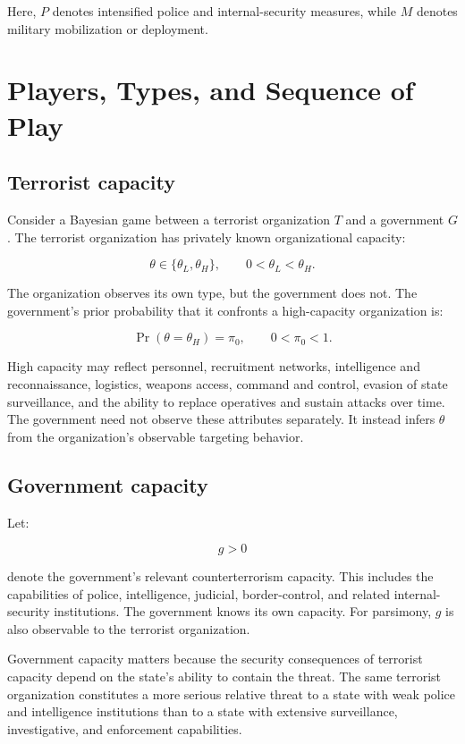 \documentclass[
  letterpaper,
  DIV=11,
  numbers=noendperiod]{scrartcl}
\begin{document}
Here, \(P\) denotes intensified police and internal-security measures,
while \(M\) denotes military mobilization or deployment.

\section{Players, Types, and Sequence of
Play}\label{players-types-and-sequence-of-play}

\subsection{Terrorist capacity}\label{terrorist-capacity}

Consider a Bayesian game between a terrorist organization \(T\) and a
government \(G\). The terrorist organization has privately known
organizational capacity:

\[
\theta\in\{\theta_L,\theta_H\},
\qquad
0<\theta_L<\theta_H.
\]

The organization observes its own type, but the government does not. The
government's prior probability that it confronts a high-capacity
organization is:

\[
\Pr(\theta=\theta_H)=\pi_0,
\qquad
0<\pi_0<1.
\]

High capacity may reflect personnel, recruitment networks, intelligence
and reconnaissance, logistics, weapons access, command and control,
evasion of state surveillance, and the ability to replace operatives and
sustain attacks over time. The government need not observe these
attributes separately. It instead infers \(\theta\) from the
organization's observable targeting behavior.

\subsection{Government capacity}\label{government-capacity}

Let:

\[
g>0
\]

denote the government's relevant counterterrorism capacity. This
includes the capabilities of police, intelligence, judicial,
border-control, and related internal-security institutions. The
government knows its own capacity. For parsimony, \(g\) is also
observable to the terrorist organization.

Government capacity matters because the security consequences of
terrorist capacity depend on the state's ability to contain the threat.
The same terrorist organization constitutes a more serious relative
threat to a state with weak police and intelligence institutions than to
a state with extensive surveillance, investigative, and enforcement
capabilities.
\end{document}
